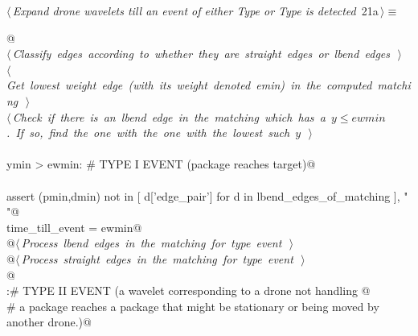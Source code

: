 \documentclass[10pt, english, oneside]{report}
\begin{document}
\begin{flushleft} \small
\begin{minipage}{\linewidth}\label{scrap21}\raggedright\small
{} $\langle\,${\itshape Expand drone wavelets till an event of either Type  or Type  is detected}\nobreak\ {\footnotesize {21a}}$\,\rangle\equiv$
\vspace{-1ex}
\begin{list}{}{} \item
\mbox{}\verb@   @\\
\mbox{}\verb@@\hbox{$\langle\,${\itshape Classify edges according to whether they are straight edges or lbend edges}\nobreak\ {\footnotesize {}}$\,\rangle$}\verb@@\\
\mbox{}\verb@@\hbox{$\langle\,${\itshape Get lowest weight edge (with its weight denoted emin) in the computed matching}\nobreak\ {\footnotesize {}}$\,\rangle$}\verb@@\\
\mbox{}\verb@@\hbox{$\langle\,${\itshape Check if there is an lbend edge in the matching which has a $y\leq ewmin$. If so, find the one with the one with the lowest such $y$}\nobreak\ {\footnotesize {}}$\,\rangle$}\verb@@\\
\mbox{}\verb@@\\
\mbox{}\verb@if ymin > ewmin:  # TYPE I EVENT (package reaches target)@\\
\mbox{}\verb@@\\
\mbox{}\verb@    assert (pmin,dmin) not in [ d['edge_pair']  for d in lbend_edges_of_matching ], " "@\\
\mbox{}\verb@    time_till_event = ewmin@\\
\mbox{}\verb@    @\hbox{$\langle\,${\itshape Process lbend edges in the matching for type  event}\nobreak\ {\footnotesize {}}$\,\rangle$}\verb@@\\
\mbox{}\verb@    @\hbox{$\langle\,${\itshape Process straight edges in the matching for type  event}\nobreak\ {\footnotesize {}}$\,\rangle$}\verb@@\\
\mbox{}\verb@    @\\
\mbox{}\verb@else:# TYPE II EVENT (a wavelet corresponding to a drone not handling @\\
\mbox{}\verb@     # a package reaches a package that might be stationary or being moved by another drone.)@\\
\mbox{}\verb@@\\

\end{list}
\end{minipage}
\end{flushleft}
\end{document}
